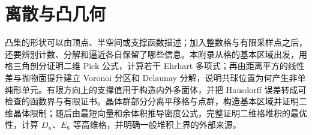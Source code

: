
% 
% 
% 
% 
% 
% 
% 
% 
% 

\chapter{离散与凸几何}
\label{g1:app:B}

\begin{chapterabstract}
	凸集的形状可以由顶点、半空间或支撑函数描述；加入整数格与有限采样点之后，还要辨别计数、分解和逼近各自保留了哪些信息。本附录从格的基本区域出发，用格三角剖分证明二维 Pick 公式，计算若干 Ehrhart 多项式；再由距离平方的线性差与抛物面提升建立 Voronoi 分区和 Delaunay 分解，说明共球位置为何产生非单纯形单元。有限方向上的支撑值用于构造内外多面体，并把 Hausdorff 误差转成可检查的函数界与有限证书。晶体群部分分离平移格与点群，构造基本区域并证明二维晶体限制；随后由最短向量和余体积推导密度公式，完整证明二维格堆积的最优性，计算 \(D_n\)、\(E_8\) 等高维格，并明确一般堆积上界的外部来源。
\end{chapterabstract}

